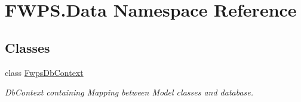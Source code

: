 \hypertarget{namespace_f_w_p_s_1_1_data}{}\section{F\+W\+P\+S.\+Data Namespace Reference}
\label{namespace_f_w_p_s_1_1_data}
\subsection*{Classes}
\begin{DoxyCompactItemize}
\item 
class \mbox{\hyperlink{class_f_w_p_s_1_1_data_1_1_fwps_db_context}{Fwps\+Db\+Context}}
\begin{DoxyCompactList}\small\item\em Db\+Context containing Mapping between Model classes and database. \end{DoxyCompactList}\end{DoxyCompactItemize}
